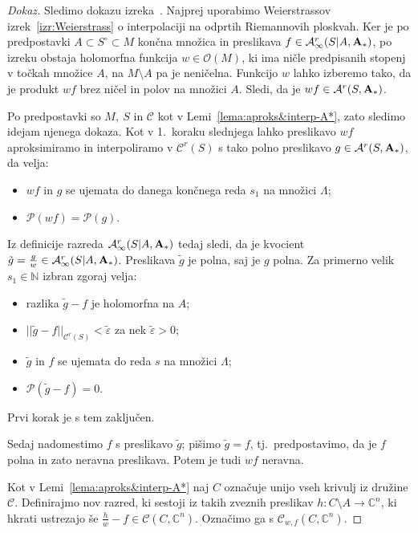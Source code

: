 \documentclass[12pt,a4paper,twoside]{article}
\theoremstyle{definition} %
\newenvironment{dokaz}[1][Dokaz]{\begin{proof}[#1]}{\end{proof}}
\theoremstyle{plain} %
\numberwithin{equation}{section}  %
\begin{document}
\begin{dokaz}
Sledimo dokazu izreka~\cite[Theorem~3.1]{alarcon2019algebraic}.
Najprej uporabimo Weierstrassov izrek~\ref{izr:Weierstrass} o interpolaciji na odprtih Riemannovih ploskvah.
Ker je po predpostavki $A \subset S^{\circ} \subset M$ končna množica in preslikava $f \in \mathcal{A}_{\infty}^{r}(S|A, \textup{\textbf{A}}_{*})$, po izreku obstaja holomorfna funkcija $w \in \mathcal{O}(M)$, ki ima ničle predpisanih stopenj v točkah množice $A$, na $M \setminus A$ pa je neničelna.
Funkcijo $w$ lahko izberemo tako, da je produkt $wf$ brez ničel in polov na množici $A$. Sledi, da je $wf \in \mathcal{A}^{r}(S, \textup{\textbf{A}}_{*})$.

Po predpostavki so $M, \ S$ in $\mathcal{C}$ kot v Lemi~\ref{lema:aproks&interp-A*}, zato sledimo idejam njenega dokaza.
Kot v 1.~koraku slednjega lahko preslikavo $wf$ aproksimiramo in interpoliramo v $\mathcal{C}^{r}(S)$ s tako polno preslikavo $g \in \mathcal{A}^{r}(S, \textup{\textbf{A}}_{*})$, da velja:
\begin{itemize}
\item $wf$ in $g$ se ujemata do danega končnega reda $s_1$ na množici $\Lambda$;
\item $\mathcal{P}(wf) = \mathcal{P}(g)$.
\end{itemize}
Iz definicije razreda $\mathcal{A}_{\infty}^{r}(S|A, \textup{\textbf{A}}_{*})$ tedaj sledi, da je kvocient $\tilde{g} = \frac{g}{w} \in \mathcal{A}_{\infty}^{r}(S|A, \textup{\textbf{A}}_{*})$. Preslikava $\tilde{g}$ je polna, saj je $g$ polna.
Za primerno velik $s_1 \in \mathbb{N}$ izbran zgoraj velja:
\begin{itemize}
\item razlika $\tilde{g}-f$ je holomorfna na $A$;
\item $||\tilde{g}-f||_{\mathcal{C}^{r}(S)} < \tilde{\varepsilon}$ za nek $\tilde{\varepsilon}>0$;
\item$\tilde{g}$ in $f$ se ujemata do reda $s$ na množici $\Lambda$;
\item $\mathcal{P}(\tilde{g}-f) = 0$.
\end{itemize}
Prvi korak je s tem zaključen. \newline

Sedaj nadomestimo $f$ s preslikavo $\tilde{g}$; pišimo $\tilde{g}=f$, tj.~predpostavimo, da je $f$ polna in zato neravna preslikava. Potem je tudi $wf$ neravna.

Kot v Lemi~\ref{lema:aproks&interp-A*} naj $C$ označuje unijo vseh krivulj iz družine $\mathcal{C}$.
Definirajmo nov razred, ki sestoji iz takih zveznih preslikav $h \colon C \setminus A \to \mathbb{C}^{n}$, ki hkrati ustrezajo še $\frac{h}{w}-f \in \mathcal{C}(C, \mathbb{C}^{n})$. Označimo ga s $\mathcal{C}_{w,f}(C, \mathbb{C}^{n})$.


\end{dokaz}
\end{document}
